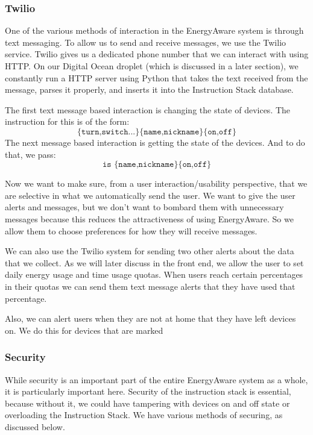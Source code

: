 \documentclass{sig-alternate-05-2015}
\begin{document}
\subsubsection{Twilio}

One of the various methods of interaction in the EnergyAware system is through text messaging. To allow us to send and receive messages, we use the Twilio service. Twilio gives us a dedicated phone number that we can interact with using HTTP. On our Digital Ocean droplet (which is discussed in a later section), we constantly run a HTTP server using Python that takes the text received from the message, parses it properly, and inserts it into the Instruction Stack database.

The first text message based interaction is changing the state of devices. The instruction for this is of the form:
\begin{equation*}
\texttt{\{turn,switch...\} \{name,nickname\} \{on,off\}} 
\end{equation*}
The next message based interaction is getting the state of the devices. And to do that, we pass:
\begin{equation*}
	\texttt{is \{name,nickname\} \{on,off\}} 
\end{equation*}

Now we want to make sure, from a user interaction/usability perspective, that we are selective in what we automatically send the user. We want to give the user alerts and messages, but we don't want to bombard them with unnecessary messages because this reduces the attractiveness of using EnergyAware. So we allow them to choose preferences for how they will receive messages.

We can also use the Twilio system for sending two other alerts about the data that we collect. As we will later discuss in the front end, we allow the user to set daily energy usage and time usage quotas. When users reach certain percentages in their quotas we can send them text message alerts that they have used that percentage.

Also, we can alert users when they are not at home that they have left devices on. We do this for devices that are marked 

\subsubsection{Security}

While security is an important part of the entire EnergyAware system as a whole, it is particularly important here. Security of the instruction stack is essential, because without it, we could have tampering with devices on and off state or overloading the Instruction Stack. We have various methods of securing, as discussed below.
\end{document}
